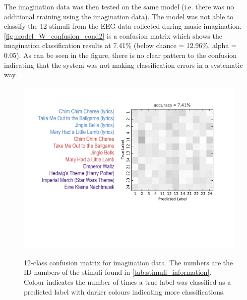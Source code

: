 The imagination data was then tested on the same model (i.e. there was no additional training using the imagination data). 
The model was not able to classify the 12 stimuli from the EEG data collected during music imagination. 
\autoref{fig:model_W_confusion_cond2} is a confusion matrix which shows the imagination classification results at 7.41\% (below chance = 12.96\%, alpha = 0.05). 
As can be seen in the figure, there is no clear pattern to the confusion indicating that the system was not making classification errors in a systematic way. 
\begin{figure}[htb] 
  \begin{center}
    \includegraphics[width=.83\textwidth,keepaspectratio=true]{Figures/model_W_confusion_cond2}
   \\\vspace{-0.8em}
    \caption{12-class confusion matrix for imagination data. The numbers are the ID numbers of the stimuli found in \autoref{tab:stimuli_information}. Colour indicates the number of times a true label was classified as a predicted label with darker colours indicating more classifications.}
        \label{fig:model_W_confusion_cond2}
  \end{center}
  \vspace{-1em}
\end{figure}

